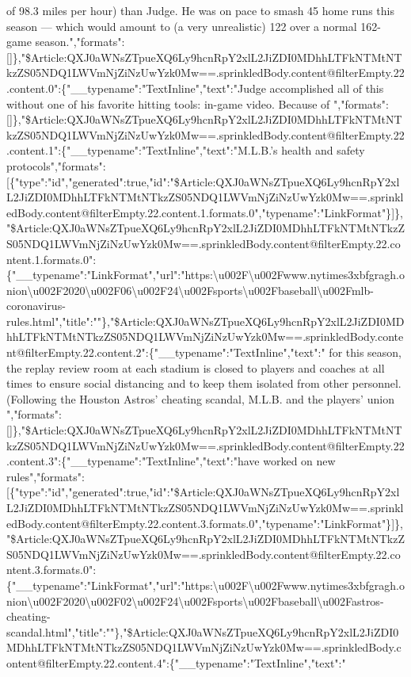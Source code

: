 of 98.3 miles per hour) than Judge. He was on pace to smash 45 home runs
this season --- which would amount to (a very unrealistic) 122 over a
normal 162-game
season.","formats":{[}{]}\},"\$Article:QXJ0aWNsZTpueXQ6Ly9hcnRpY2xlL2JiZDI0MDhhLTFkNTMtNTkzZS05NDQ1LWVmNjZiNzUwYzk0Mw==.sprinkledBody.content@filterEmpty.22.content.0":\{"\_\_typename":"TextInline","text":"Judge
accomplished all of this without one of his favorite hitting tools:
in-game video. Because of
","formats":{[}{]}\},"\$Article:QXJ0aWNsZTpueXQ6Ly9hcnRpY2xlL2JiZDI0MDhhLTFkNTMtNTkzZS05NDQ1LWVmNjZiNzUwYzk0Mw==.sprinkledBody.content@filterEmpty.22.content.1":\{"\_\_typename":"TextInline","text":"M.L.B.'s
health and safety
protocols","formats":{[}\{"type":"id","generated":true,"id":"\$Article:QXJ0aWNsZTpueXQ6Ly9hcnRpY2xlL2JiZDI0MDhhLTFkNTMtNTkzZS05NDQ1LWVmNjZiNzUwYzk0Mw==.sprinkledBody.content@filterEmpty.22.content.1.formats.0","typename":"LinkFormat"\}{]}\},"\$Article:QXJ0aWNsZTpueXQ6Ly9hcnRpY2xlL2JiZDI0MDhhLTFkNTMtNTkzZS05NDQ1LWVmNjZiNzUwYzk0Mw==.sprinkledBody.content@filterEmpty.22.content.1.formats.0":\{"\_\_typename":"LinkFormat","url":"https:\textbackslash{}u002F\textbackslash{}u002Fwww.nytimes3xbfgragh.onion\textbackslash{}u002F2020\textbackslash{}u002F06\textbackslash{}u002F24\textbackslash{}u002Fsports\textbackslash{}u002Fbaseball\textbackslash{}u002Fmlb-coronavirus-rules.html","title":""\},"\$Article:QXJ0aWNsZTpueXQ6Ly9hcnRpY2xlL2JiZDI0MDhhLTFkNTMtNTkzZS05NDQ1LWVmNjZiNzUwYzk0Mw==.sprinkledBody.content@filterEmpty.22.content.2":\{"\_\_typename":"TextInline","text":"
for this season, the replay review room at each stadium is closed to
players and coaches at all times to ensure social distancing and to keep
them isolated from other personnel. (Following the Houston Astros'
cheating scandal, M.L.B. and the players' union
","formats":{[}{]}\},"\$Article:QXJ0aWNsZTpueXQ6Ly9hcnRpY2xlL2JiZDI0MDhhLTFkNTMtNTkzZS05NDQ1LWVmNjZiNzUwYzk0Mw==.sprinkledBody.content@filterEmpty.22.content.3":\{"\_\_typename":"TextInline","text":"have
worked on new
rules","formats":{[}\{"type":"id","generated":true,"id":"\$Article:QXJ0aWNsZTpueXQ6Ly9hcnRpY2xlL2JiZDI0MDhhLTFkNTMtNTkzZS05NDQ1LWVmNjZiNzUwYzk0Mw==.sprinkledBody.content@filterEmpty.22.content.3.formats.0","typename":"LinkFormat"\}{]}\},"\$Article:QXJ0aWNsZTpueXQ6Ly9hcnRpY2xlL2JiZDI0MDhhLTFkNTMtNTkzZS05NDQ1LWVmNjZiNzUwYzk0Mw==.sprinkledBody.content@filterEmpty.22.content.3.formats.0":\{"\_\_typename":"LinkFormat","url":"https:\textbackslash{}u002F\textbackslash{}u002Fwww.nytimes3xbfgragh.onion\textbackslash{}u002F2020\textbackslash{}u002F02\textbackslash{}u002F24\textbackslash{}u002Fsports\textbackslash{}u002Fbaseball\textbackslash{}u002Fastros-cheating-scandal.html","title":""\},"\$Article:QXJ0aWNsZTpueXQ6Ly9hcnRpY2xlL2JiZDI0MDhhLTFkNTMtNTkzZS05NDQ1LWVmNjZiNzUwYzk0Mw==.sprinkledBody.content@filterEmpty.22.content.4":\{"\_\_typename":"TextInline","text":"
